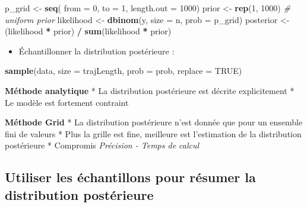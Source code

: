 \documentclass[
  a4paper,11pt,twoside,onecolumn,openright,final,oldfontcommands]{memoir}
\newenvironment{Shaded}{\begin{snugshade}}{\end{snugshade}}
\newcommand{\CommentTok}[1]{\textcolor[rgb]{0.56,0.35,0.01}{\textit{#1}}}
\newcommand{\DataTypeTok}[1]{\textcolor[rgb]{0.13,0.29,0.53}{#1}}
\newcommand{\DecValTok}[1]{\textcolor[rgb]{0.00,0.00,0.81}{#1}}
\newcommand{\KeywordTok}[1]{\textcolor[rgb]{0.13,0.29,0.53}{\textbf{#1}}}
\newcommand{\NormalTok}[1]{#1}
\newcommand{\OperatorTok}[1]{\textcolor[rgb]{0.81,0.36,0.00}{\textbf{#1}}}
\newcommand{\OtherTok}[1]{\textcolor[rgb]{0.56,0.35,0.01}{#1}}
\newcommand{\StringTok}[1]{\textcolor[rgb]{0.31,0.60,0.02}{#1}}
\providecommand{\tightlist}{%
  \setlength{\itemsep}{0pt}\setlength{\parskip}{0pt}}
\theoremstyle{definition}
\theoremstyle{definition}
\theoremstyle{definition}
\theoremstyle{remark}
\begin{document}
\begin{Shaded}
\begin{Highlighting}[]
\NormalTok{p\_grid \textless{}{-}}\StringTok{ }\KeywordTok{seq}\NormalTok{( }\DataTypeTok{from =} \DecValTok{0}\NormalTok{, }\DataTypeTok{to =} \DecValTok{1}\NormalTok{, }\DataTypeTok{length.out =} \DecValTok{1000}\NormalTok{)}
\NormalTok{prior \textless{}{-}}\StringTok{ }\KeywordTok{rep}\NormalTok{(}\DecValTok{1}\NormalTok{, }\DecValTok{1000}\NormalTok{) }\CommentTok{\# uniform prior}
\NormalTok{likelihood \textless{}{-}}\StringTok{ }\KeywordTok{dbinom}\NormalTok{(y, }\DataTypeTok{size =}\NormalTok{ n, }\DataTypeTok{prob =}\NormalTok{ p\_grid)}
\NormalTok{posterior \textless{}{-}}\StringTok{ }\NormalTok{(likelihood }\OperatorTok{*}\StringTok{ }\NormalTok{prior) }\OperatorTok{/}\StringTok{ }\KeywordTok{sum}\NormalTok{(likelihood }\OperatorTok{*}\StringTok{ }\NormalTok{prior)}
\end{Highlighting}
\end{Shaded}

\begin{itemize}
\tightlist
\item
  Échantillonner la distribution postérieure :
\end{itemize}

\begin{Shaded}
\begin{Highlighting}[]
\KeywordTok{sample}\NormalTok{(data, }\DataTypeTok{size =}\NormalTok{ trajLength, }\DataTypeTok{prob =}\NormalTok{ prob, }\DataTypeTok{replace =} \OtherTok{TRUE}\NormalTok{)}
\end{Highlighting}
\end{Shaded}

\textbf{Méthode analytique}
* La distribution postérieure est décrite explicitement
* Le modèle est fortement contraint

\textbf{Méthode Grid}
* La distribution postérieure n'est donnée que pour un ensemble fini de valeurs
* Plus la grille est fine, meilleure est l'estimation de la distribution postérieure
* Compromis \emph{Précision - Temps de calcul}

\hypertarget{utiliser-les-uxe9chantillons-pour-ruxe9sumer-la-distribution-postuxe9rieure}{%
\subsection{Utiliser les échantillons pour résumer la distribution postérieure}\label{utiliser-les-uxe9chantillons-pour-ruxe9sumer-la-distribution-postuxe9rieure}}
\end{document}
